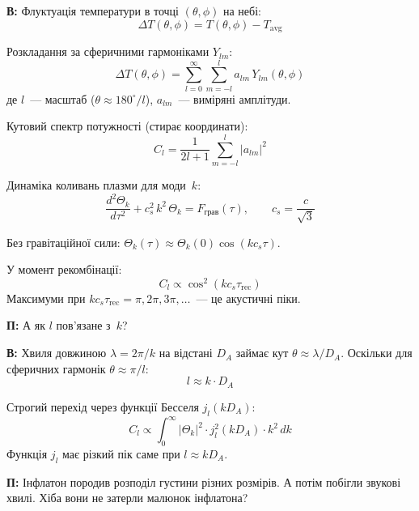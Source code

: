 \documentclass[12pt, a4paper]{article}
\newcommand{\Q}[1]{%
    \begin{questionbox}
        {\color{qcolor}\bfseries\sffamily П:} #1
    \end{questionbox}
}
\newcommand{\A}[1]{%
    \begin{answerbox}
        {\bfseries\sffamily В:} #1
    \end{answerbox}
}
\begin{document}
\A{Флуктуація температури в точці $(\theta,\phi)$ на небі:
\begin{equation}
    \Delta T(\theta,\phi) = T(\theta,\phi) - T_\text{avg}
\end{equation}

Розкладання за сферичними гармоніками $Y_{lm}$:
\begin{equation}
    \Delta T(\theta,\phi) = \sum_{l=0}^{\infty}\sum_{m=-l}^{l} a_{lm}\,Y_{lm}(\theta,\phi)
\end{equation}
де $l$~--- масштаб ($\theta \approx 180^\circ/l$), $a_{lm}$~--- виміряні амплітуди.

Кутовий спектр потужності (стирає координати):
\begin{equation}
    C_l = \frac{1}{2l+1}\sum_{m=-l}^{l}|a_{lm}|^2
\end{equation}

Динаміка коливань плазми для моди~$k$:
\begin{equation}
    \frac{d^2\Theta_k}{d\tau^2} + c_s^2\,k^2\,\Theta_k = F_\text{грав}(\tau), \qquad c_s = \frac{c}{\sqrt{3}}
\end{equation}

Без гравітаційної сили: $\Theta_k(\tau) \approx \Theta_k(0)\cos(kc_s\tau)$.

У момент рекомбінації:
\begin{equation}
    C_l \propto \cos^2\!\left(kc_s\tau_\text{rec}\right)
\end{equation}
Максимуми при $kc_s\tau_\text{rec} = \pi, 2\pi, 3\pi,\ldots$~--- це акустичні піки.}


\Q{А як $l$ пов'язане з~$k$?}

\A{Хвиля довжиною $\lambda = 2\pi/k$ на відстані $D_A$ займає кут $\theta \approx \lambda/D_A$. Оскільки для сферичних гармонік $\theta \approx \pi/l$:
\begin{equation}
    l \approx k\cdot D_A
\end{equation}

Строгий перехід через функції Бесселя $j_l(kD_A)$:
\begin{equation}
    C_l \propto \int_0^{\infty}|\Theta_k|^2\cdot j_l^2(kD_A)\cdot k^2\,dk
\end{equation}
Функція $j_l$ має різкий пік саме при $l \approx kD_A$.}


\Q{Інфлатон породив розподіл густини різних розмірів. А потім побігли звукові хвилі. Хіба вони не затерли малюнок інфлатона?}
\end{document}
